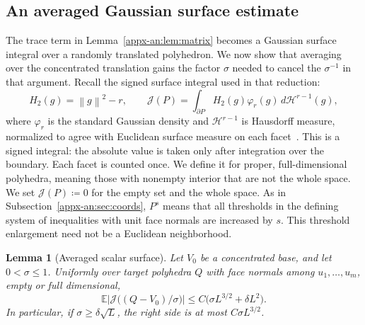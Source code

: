\documentclass[11pt,letterpaper]{article}
\newtheorem{lemma}{Lemma}
\theoremstyle{remark}
\newcommand{\E}{\mathbb E}
\newcommand{\norm}[1]{\left\lVert#1\right\rVert}
\newcommand{\dd}{\,d}
\newcommand{\surf}{\mathcal J}
\begin{document}
\subsection{An averaged Gaussian surface estimate}
\label{appx-an:sec:surface}

The trace term in Lemma~\ref{appx-an:lem:matrix} becomes a Gaussian
surface integral over a randomly translated polyhedron. We now show
that averaging over the concentrated translation gains the factor
\(\sigma\) needed to cancel the \(\sigma^{-1}\) in that argument.
Recall the signed surface integral used in that reduction:
\[
 H_2(g)=\norm g^2-r,\qquad
 \surf(P)=\int_{\partial P}H_2(g)\varphi_r(g)\dd\mathcal H^{r-1}(g),
\]
where \(\varphi_r\) is the standard Gaussian density and
\(\mathcal H^{r-1}\) is Hausdorff measure, normalized to agree with
Euclidean surface measure on each facet~\cite[Chapter~2]{EvansGariepy2015}.
This is a signed integral: the absolute value is taken only after
integration over the boundary. Each facet is counted once. We define
it for proper, full-dimensional polyhedra, meaning those with nonempty
interior that are not the whole space.
We set \(\surf(P)\coloneqq 0\) for the empty set and the whole space. As in
Subsection~\ref{appx-an:sec:coords}, \(P^s\) means that all thresholds
in the defining system of inequalities with unit face normals are increased by
\(s\). This threshold enlargement need not be a Euclidean neighborhood.

\begin{lemma}[Averaged scalar surface]\label{appx-an:lem:surface}
Let \(V_0\) be a concentrated base, and let \(0<\sigma\le1\). Uniformly
over target polyhedra \(Q\) with face normals among \(u_1,\ldots,u_m\), empty
or full dimensional,
\begin{equation}
 \E\left|\surf\bigl((Q-V_0)/\sigma\bigr)\right|
 \le C\bigl(\sigma L^{3/2}+\delta L^2\bigr).
 \label{appx-an:surface-bound}
\end{equation}
In particular, if \(\sigma\ge\delta\sqrt L\), the right side is at most
\(C\sigma L^{3/2}\).
\end{lemma}
\end{document}
